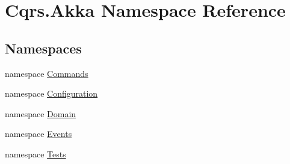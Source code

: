 \hypertarget{namespaceCqrs_1_1Akka}{}\section{Cqrs.\+Akka Namespace Reference}
\label{namespaceCqrs_1_1Akka}
\subsection*{Namespaces}
\begin{DoxyCompactItemize}
\item 
namespace \hyperlink{namespaceCqrs_1_1Akka_1_1Commands}{Commands}
\item 
namespace \hyperlink{namespaceCqrs_1_1Akka_1_1Configuration}{Configuration}
\item 
namespace \hyperlink{namespaceCqrs_1_1Akka_1_1Domain}{Domain}
\item 
namespace \hyperlink{namespaceCqrs_1_1Akka_1_1Events}{Events}
\item 
namespace \hyperlink{namespaceCqrs_1_1Akka_1_1Tests}{Tests}
\end{DoxyCompactItemize}
